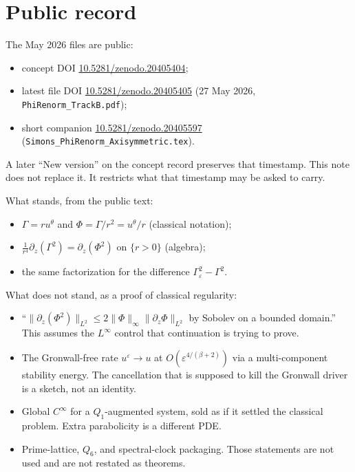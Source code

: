 \documentclass[11pt]{article}
\theoremstyle{definition}
\newcommand{\eps}{\varepsilon}
\newcommand{\ut}{u^{\theta}}
\newcommand{\Ph}{\Phi}
\newcommand{\Ga}{\Gamma}
\newcommand{\Lint}{L^{\infty}}
\newcommand{\norm}[2]{\|#1\|_{#2}}
\begin{document}
\section{Public record}
\label{sec:record}

The May 2026 files are public:
\begin{itemize}[leftmargin=1.2em]
\item concept DOI
\href{https://doi.org/10.5281/zenodo.20405404}{10.5281/zenodo.20405404};
\item latest file DOI
\href{https://doi.org/10.5281/zenodo.20405405}{10.5281/zenodo.20405405}
(27 May 2026, \texttt{PhiRenorm\_TrackB.pdf});
\item short companion
\href{https://doi.org/10.5281/zenodo.20405597}{10.5281/zenodo.20405597}
(\texttt{Simons\_PhiRenorm\_Axisymmetric.tex}).
\end{itemize}
A later ``New version'' on the concept record preserves that timestamp.
This note does not replace it. It restricts what that timestamp may be
asked to carry.

What stands, from the public text:
\begin{itemize}[leftmargin=1.2em]
\item \(\Ga=r\ut\) and \(\Ph=\Ga/r^2=\ut/r\) (classical notation);
\item \(\frac1{r^4}\partial_z(\Ga^2)=\partial_z(\Ph^2)\) on \(\{r>0\}\)
(algebra);
\item the same factorization for the difference
\(\Ga_\eps^2-\Ga^2\).
\end{itemize}

What does not stand, as a proof of classical regularity:
\begin{itemize}[leftmargin=1.2em]
\item ``\(\norm{\partial_z(\Ph^2)}{L^2}\le 2\norm{\Ph}{\infty}\norm{\partial_z\Ph}{L^2}\)
by Sobolev on a bounded domain.''
This assumes the \(\Lint\) control that continuation is trying to prove.
\item The Gronwall-free rate \(u^\eps\to u\) at
\(O(\eps^{4/(\beta+2)})\) via a multi-component stability energy.
The cancellation that is supposed to kill the Gronwall driver is a
sketch, not an identity.
\item Global \(C^\infty\) for a \(Q_1\)-augmented system, sold as if it
settled the classical problem. Extra parabolicity is a different PDE.
\item Prime-lattice, \(Q_6\), and spectral-clock packaging.
Those statements are not used and are not restated as theorems.
\end{itemize}
\end{document}
